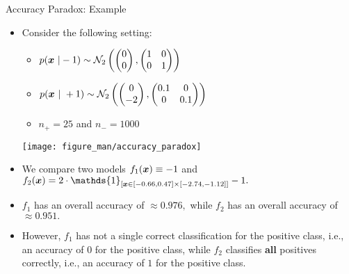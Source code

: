 \begin{vbframe}{Accuracy Paradox: Example}
%
	\footnotesize
	\begin{itemize}
		\item Consider the following setting:
%		

		\begin{minipage}{0.55\textwidth}    
%			
		\begin{itemize}
			\scriptsize
%			
			\item $p(\bm{x} ~| -1) \sim \mathcal{N}_2\left( 
			\begin{pmatrix}
				0 \\ 0
			\end{pmatrix}  , 
			\begin{pmatrix}
			1  & 0 \\ 0 & 1
			\end{pmatrix}   \right) $
%		 
			\item  $p(\bm{x} ~| ~ +1) \sim \mathcal{N}_2\left( 
			\begin{pmatrix}
				0 \\ -2
			\end{pmatrix}  , 
			\begin{pmatrix}
				0.1  & 0 \\ 0 & 0.1
			\end{pmatrix}   \right)  $
%		
			\item $n_+ = 25$ and $n_- = 1000$
%		
		\end{itemize}
		\end{minipage}
		\begin{minipage}{0.35\textwidth}    
		\begin{center}
			\texttt{[image: figure\_man/accuracy\_paradox]}
		\end{center}
		\end{minipage}
%	
	\item We compare two models $f_1(\bm{x}) \equiv -1$ and $f_2(\xv) = 2 \cdot \mathds{1}_{[ \xv \in [-0.66,0.47]\times [-2.74,-1.12] ]} -1.$
%	
	\item $f_1$ has an overall accuracy of $\approx 0.976,$ while $f_2$ has an overall accuracy of $\approx 0.951.$
%	
	\item However, $f_1$ has not a single correct classification for the positive class, i.e., an accuracy of $0$ for the positive class, while $f_2$ classifies \textbf{all} positives correctly, i.e., an accuracy of $1$ for the positive class.
%	
	\end{itemize}
\end{vbframe} 



